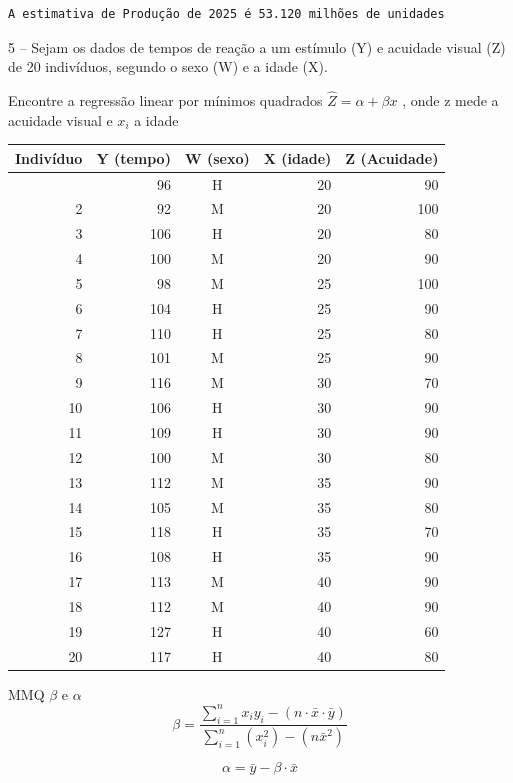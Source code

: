\documentclass[11pt]{article}
\begin{document}
    \begin{Verbatim}[commandchars=\\\{\}]
A estimativa de Produção de 2025 é 53.120 milhões de unidades
    \end{Verbatim}

    5 -- Sejam os dados de tempos de reação a um estímulo (Y) e acuidade
visual (Z) de 20 indivíduos, segundo o sexo (W) e a idade (X).

Encontre a regressão linear por mínimos quadrados
\(\hat{Z} = \alpha + \beta x\) , onde z mede a acuidade visual e \(x_i\)
a idade

{\def\LTcaptype{none} %
\begin{longtable}[]{@{}rrcrr@{}}
\toprule\noalign{}
Indivíduo & Y (tempo) & W (sexo) & X (idade) & Z (Acuidade) \\
\midrule\noalign{}
\endhead
\bottomrule\noalign{}
\endlastfoot
1 & 96 & H & 20 & 90 \\
2 & 92 & M & 20 & 100 \\
3 & 106 & H & 20 & 80 \\
4 & 100 & M & 20 & 90 \\
5 & 98 & M & 25 & 100 \\
6 & 104 & H & 25 & 90 \\
7 & 110 & H & 25 & 80 \\
8 & 101 & M & 25 & 90 \\
9 & 116 & M & 30 & 70 \\
10 & 106 & H & 30 & 90 \\
11 & 109 & H & 30 & 90 \\
12 & 100 & M & 30 & 80 \\
13 & 112 & M & 35 & 90 \\
14 & 105 & M & 35 & 80 \\
15 & 118 & H & 35 & 70 \\
16 & 108 & H & 35 & 90 \\
17 & 113 & M & 40 & 90 \\
18 & 112 & M & 40 & 90 \\
19 & 127 & H & 40 & 60 \\
20 & 117 & H & 40 & 80 \\
\end{longtable}
}

MMQ \(\beta\) e \(\alpha\) \[
    \beta = \frac{\displaystyle\sum_{i=1}^{n} x_i y_i - (n\cdot\bar{x}\cdot\bar{y})}{\displaystyle\sum_{i=1}^{n}(x_i^2) - (n\bar{x}^2)}
\]

\[
\alpha = \bar{y}-\beta\cdot \bar{x}
\]
\end{document}

